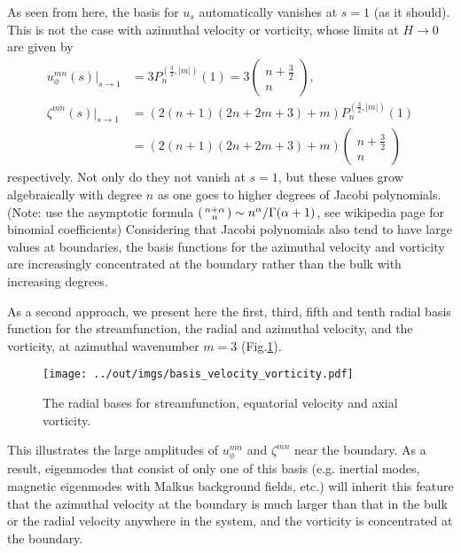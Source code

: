 As seen from here, the basis for $u_s$ automatically vanishes at $s=1$ (as it should). This is not the case with azimuthal velocity or vorticity, whose limits at $H\rightarrow 0$ are given by
\[\begin{aligned}
    u_\phi^{mn}(s)|_{s\rightarrow 1} &= 3 P_n^{(\frac{3}{2}, |m|)}(1) = 3 \begin{pmatrix} n + \frac{3}{2} \\ n \end{pmatrix},\\
    \zeta^{mn}(s)|_{s\rightarrow 1} &= \left(2(n+1)(2n+2m+3) + m\right) P_n^{(\frac{3}{2}, |m|)}(1) \\ 
    &= \left(2(n+1)(2n+2m+3) + m\right) \begin{pmatrix} n + \frac{3}{2} \\ n \end{pmatrix}
\end{aligned}\]
respectively. Not only do they not vanish at $s=1$, but these values grow algebraically with degree $n$ as one goes to higher degrees of Jacobi polynomials. (Note: use the asymptotic formula $\begin{psmallmatrix} n+\alpha \\ n \end{psmallmatrix} \sim n^\alpha/\Gamma(\alpha + 1)$, see wikipedia page for binomial coefficients) 
Considering that Jacobi polynomials also tend to have large values at boundaries, the basis functions for the azimuthal velocity and vorticity are increasingly concentrated at the boundary rather than the bulk with increasing degrees.

As a second approach, we present here the first, third, fifth and tenth radial basis function for the streamfunction, the radial and azimuthal velocity, and the vorticity, at azimuthal wavenumber $m=3$ (Fig.\ref{fig:rad-basis}). 
\begin{figure}[htbp]
    \centering
    \texttt{[image: ../out/imgs/basis\_velocity\_vorticity.pdf]}
    \caption{The radial bases for streamfunction, equatorial velocity and axial vorticity.}
    \label{fig:rad-basis}
\end{figure}
This illustrates the large amplitudes of $u_\phi^{mn}$ and $\zeta^{mn}$ near the boundary.
As a result, eigenmodes that consist of only one of this basis (e.g. inertial modes, magnetic eigenmodes with Malkus background fields, etc.) will inherit this feature that the azimuthal velocity at the boundary is much larger than that in the bulk or the radial velocity anywhere in the system, and the vorticity is concentrated at the boundary.
